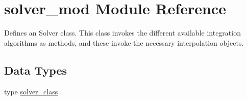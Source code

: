 \hypertarget{namespacesolver__mod}{}\section{solver\+\_\+mod Module Reference}
\label{namespacesolver__mod}


Defines an Solver class. This class invokes the different available integration algorithms as methods, and these invoke the necessary interpolation objects.  


\subsection*{Data Types}
\begin{DoxyCompactItemize}
\item 
type \mbox{\hyperlink{structsolver__mod_1_1solver__class}{solver\+\_\+class}}
\end{DoxyCompactItemize}
